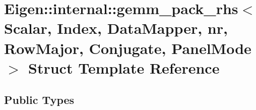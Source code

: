 \hypertarget{struct_eigen_1_1internal_1_1gemm__pack__rhs_3_01_scalar_00_01_index_00_01_data_mapper_00_01nr_00b7f2442d9ba6129104d4662213736528}{}\section{Eigen\+:\+:internal\+:\+:gemm\+\_\+pack\+\_\+rhs$<$ Scalar, Index, Data\+Mapper, nr, Row\+Major, Conjugate, Panel\+Mode $>$ Struct Template Reference}
\label{struct_eigen_1_1internal_1_1gemm__pack__rhs_3_01_scalar_00_01_index_00_01_data_mapper_00_01nr_00b7f2442d9ba6129104d4662213736528}
\subsection*{Public Types}
